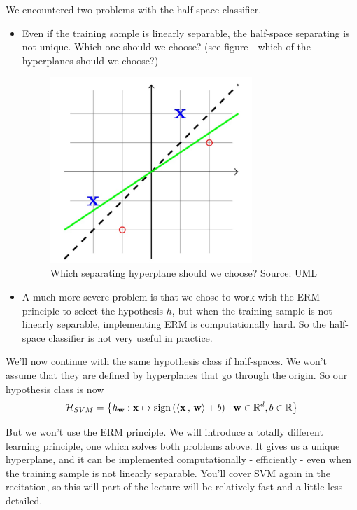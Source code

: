We encountered two problems with the half-space classifier. 
\begin{itemize}
  \item 
    Even if the training sample is linearly separable, the half-space separating
    is not unique. Which one should we choose? (see figure - which of the
    hyperplanes should we choose?)

    \begin{figure}[h!]
      \centering
      \includegraphics[width=3in]{nonuniq.pdf}
      \caption{Which separating hyperplane should we choose? Source: UML}
    \end{figure}


  \item A much more severe problem is that we chose to work with the ERM
    principle to select the hypothesis $h$, but when the training sample is not
    linearly separable, implementing ERM is computationally hard. So the
    half-space classifier is not very useful in practice. 
    
\end{itemize}

We'll now continue with the same hypothesis class if half-spaces. We won't
assume that they are defined by hyperplanes that go through the origin. So our
hypothesis class is now
\[
  \mathcal{H}_{SVM} = \left\{  h_{\mathbf{w}}: \mathbf{x} \mapsto \text{sign}\left(
  {\left\langle \mathbf{x}\,,\,\mathbf{w} \right\rangle}  +b \right)
\,\big|\, \mathbf{w}\in \mathbb{R}^d, b\in \mathbb{R} \right\}
\]


But we won't use the ERM principle. We will 
introduce a totally different learning principle, one which solves both problems
above. It gives us a unique hyperplane, and it can be implemented
computationally - efficiently - even when the training sample is not linearly
separable. You'll cover SVM again in the recitation, so this will part of the lecture
will be relatively fast and a little less detailed. 



